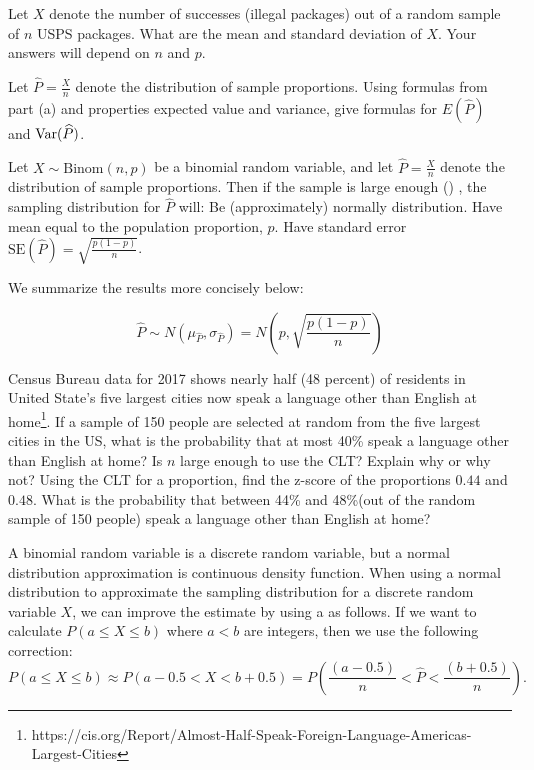 \bb
\ii Let $X$ denote the number of successes (illegal packages) out of a random sample of $n$ USPS packages. What are the mean and standard deviation of $X$. Your answers will depend on $n$ and $p$. \vfill

\ii Let $\widehat{P} = \frac{X}{n}$ denote the distribution of sample proportions. Using formulas from part (a) and properties expected value and variance, give formulas for $E( \widehat{P} )$ and $\mbox{Var}( \widehat{P} )$. \vfill
\ee
\ee

\clearpage


\bbox
Let $X \sim \mbox{Binom}(n,p)$ be a binomial random variable, and let $\widehat{P} = \frac{X}{n}$ denote the distribution of sample proportions. Then if the sample is large enough () , the sampling distribution for $\widehat{P}$ will:
\bi
\ii Be (approximately) normally distribution.
\ii Have mean equal to the population proportion, $p$.
\ii Have standard error $\mbox{SE}(\widehat{P}) = \sqrt{\frac{p(1-p)}{n}}$.
\ei

We summarize the results more concisely below:

\alert{ \[ \widehat{P} \sim N \left( \mu_{\widehat{P}} , \sigma_{\widehat{P}} \right) = N \left( p  , \sqrt{\frac{p(1-p)}{n}} \right) \] }
\ebox




\bb[resume]
\ii Census Bureau data for 2017 shows nearly half (48 percent) of residents in United State's five largest cities now speak a language other than English at home\footnote{https://cis.org/Report/Almost-Half-Speak-Foreign-Language-Americas-Largest-Cities}. If a sample of 150 people are selected at random from the five largest cities in the US, what is the probability that at most 40\% speak a language other than English at home? \label{q:language}
\bb
\ii Is $n$ large enough to use the CLT? Explain why or why not? \vfill
\ii Using the CLT for a proportion, find the z-score of the proportions $0.44$ and $0.48$. \vfill
\ii What is the probability that between 44\%  and 48\%(out of the random sample of 150 people) speak a language other than English at home? \label{q:language-no}\vfill
\ee
\ee

\clearpage


\bbox
A binomial random variable is a discrete random variable, but a normal distribution approximation is continuous density function.
When using a normal distribution to approximate the sampling distribution for a discrete random variable $X$, we can improve the estimate by using a \textbf{} as follows. If we want to calculate $P( a \leq X \leq b)$ where $a<b$ are integers, then we use
the following correction:
\[ P( a \leq X \leq b) \approx P(a-0.5 < X < b+0.5) =  P \left( \frac{(a-0.5)}{n} < \widehat{P} < \frac{(b+0.5)}{n} \right).\]
\ebox

